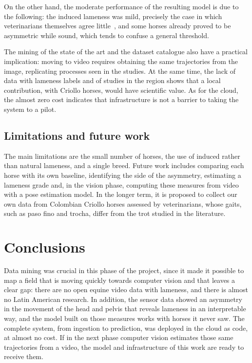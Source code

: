 \documentclass[conference,a4paper]{IEEEtran}
\begin{document}
On the other hand, the moderate performance of the resulting model is due to the following: the induced lameness was mild, precisely the case in which veterinarians themselves agree little~\cite{keegan2010,hammarberg2016}, and some horses already proved to be asymmetric while sound, which tends to confuse a general threshold.

The mining of the state of the art and the dataset catalogue also have a practical implication: moving to video requires obtaining the same trajectories from the image, replicating processes seen in the studies. At the same time, the lack of data with lameness labels and of studies in the region shows that a local contribution, with Criollo horses, would have scientific value. As for the cloud, the almost zero cost indicates that infrastructure is not a barrier to taking the system to a pilot.

\subsection{Limitations and future work}

The main limitations are the small number of horses, the use of induced rather than natural lameness, and a single breed. Future work includes comparing each horse with its own baseline, identifying the side of the asymmetry, estimating a lameness grade and, in the vision phase, computing these measures from video with a pose estimation model. In the longer term, it is proposed to collect our own data from Colombian Criollo horses assessed by veterinarians, whose gaits, such as paso fino and trocha, differ from the trot studied in the literature.

\section{Conclusions}

Data mining was crucial in this phase of the project, since it made it possible to map a field that is moving quickly towards computer vision and that leaves a clear gap: there are no open equine video data with lameness, and there is almost no Latin American research. In addition, the sensor data showed an asymmetry in the movement of the head and pelvis that reveals lameness in an interpretable way, and the model built on those measures works with horses it never saw. The complete system, from ingestion to prediction, was deployed in the cloud as code, at almost no cost. If in the next phase computer vision estimates those same trajectories from a video, the model and infrastructure of this work are ready to receive them.
\end{document}
